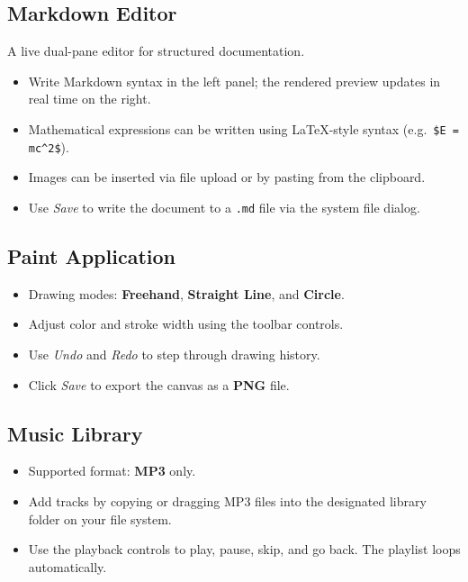 \documentclass[a4paper,12pt]{article}
\begin{document}
\subsection{Markdown Editor}
 
A live dual-pane editor for structured documentation.
 
\begin{itemize}[leftmargin=1.5em]
    \item Write Markdown syntax in the left panel; the rendered preview updates in real time on the right.
    \item Mathematical expressions can be written using \LaTeX-style syntax (e.g.\ \texttt{\$E = mc\^{}2\$}).
    \item Images can be inserted via file upload or by pasting from the clipboard.
    \item Use \textit{Save} to write the document to a \texttt{.md} file via the system file dialog.
\end{itemize}
 
\subsection{Paint Application}
 
\begin{itemize}[leftmargin=1.5em]
    \item Drawing modes: \textbf{Freehand}, \textbf{Straight Line}, and \textbf{Circle}.
    \item Adjust color and stroke width using the toolbar controls.
    \item Use \textit{Undo} and \textit{Redo} to step through drawing history.
    \item Click \textit{Save} to export the canvas as a \textbf{PNG} file.
\end{itemize}
 
\subsection{Music Library}
 
\begin{itemize}[leftmargin=1.5em]
    \item Supported format: \textbf{MP3} only.
    \item Add tracks by copying or dragging MP3 files into the designated library folder on your file system.
    \item Use the playback controls to play, pause, skip, and go back. The playlist loops automatically.
\end{itemize}
 
\end{document}
